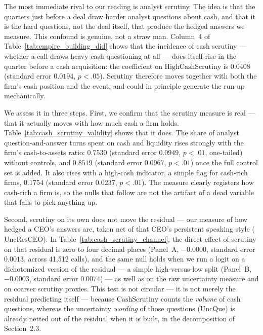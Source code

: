 The most immediate rival to our reading is analyst scrutiny. The idea is that the quarters just before a deal draw harder analyst questions about cash, and that it is the hard questions, not the deal itself, that produce the hedged answers we measure. This confound is genuine, not a straw man. Column~4 of Table~\ref{tab:empire_building_did} shows that the incidence of cash scrutiny --- whether a call draws heavy cash questioning at all --- does itself rise in the quarter before a cash acquisition: the coefficient on $\mathrm{HighCashScrutiny}$ is $0.0408$ (standard error $0.0194$, $p<.05$). Scrutiny therefore moves together with both the firm's cash position and the event, and could in principle generate the run-up mechanically.

We assess it in three steps. First, we confirm that the scrutiny measure is real --- that it actually moves with how much cash a firm holds. Table~\ref{tab:cash_scrutiny_validity} shows that it does. The share of analyst question-and-answer turns spent on cash and liquidity rises strongly with the firm's cash-to-assets ratio: $0.7530$ (standard error $0.0949$, $p<.01$, one-tailed) without controls, and $0.8519$ (standard error $0.0967$, $p<.01$) once the full control set is added. It also rises with a high-cash indicator, a simple flag for cash-rich firms, $0.1754$ (standard error $0.0237$, $p<.01$). The measure clearly registers how cash-rich a firm is, so the nulls that follow are not the artifact of a dead variable that fails to pick anything up.

Second, scrutiny on its own does not move the residual --- our measure of how hedged a CEO's answers are, taken net of that CEO's persistent speaking style ($\mathrm{UncResCEO}$). In Table~\ref{tab:cash_scrutiny_channel}, the direct effect of scrutiny on that residual is zero to four decimal places (Panel~A, $-0.0000$, standard error $0.0013$, across 41,512 calls), and the same null holds when we run a logit on a dichotomized version of the residual --- a simple high-versus-low split (Panel~B, $-0.0003$, standard error $0.0074$) --- as well as on the raw uncertainty measure and on coarser scrutiny proxies. This test is not circular --- it is not merely the residual predicting itself --- because $\mathrm{CashScrutiny}$ counts the \emph{volume} of cash questions, whereas the uncertainty \emph{wording} of those questions ($\mathrm{UncQue}$) is already netted out of the residual when it is built, in the decomposition of Section~2.3.

